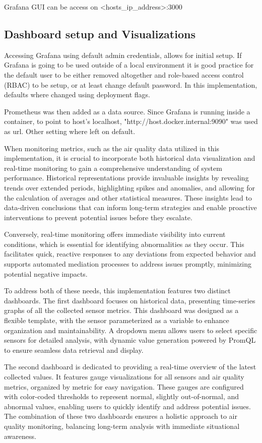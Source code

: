 Grafana GUI can be access on <hosts\_ip\_address>:3000

\subsection{Dashboard setup and Visualizations}
Accessing Grafana using default admin credentials, allows for initial setup. If Grafana is going to be used outside of a local environment it is good practice for the default user to be either removed altogether and role-based access control (RBAC) to be setup, or at least change default password. In this implementation, defaults where changed using deployment flags.

Prometheus was then added as a data source. Since Grafana is running inside a container, to point to host's localhost, "http://host.docker.internal:9090" was used as url. Other setting where left on default.

When monitoring metrics, such as the air quality data utilized in this implementation, it is crucial to incorporate both historical data visualization and real-time monitoring to gain a comprehensive understanding of system performance. Historical representations provide invaluable insights by revealing trends over extended periods, highlighting spikes and anomalies, and allowing for the calculation of averages and other statistical measures. These insights lead to data-driven conclusions that can inform long-term strategies and enable proactive interventions to prevent potential issues before they escalate.

Conversely, real-time monitoring offers immediate visibility into current conditions, which is essential for identifying abnormalities as they occur. This facilitates quick, reactive responses to any deviations from expected behavior and supports automated mediation processes to address issues promptly, minimizing potential negative impacts.

To address both of these needs, this implementation features two distinct dashboards. The first dashboard focuses on historical data, presenting time-series graphs of all the collected sensor metrics. This dashboard was designed as a flexible template, with the sensor parameterized as a variable to enhance organization and maintainability. A dropdown menu allows users to select specific sensors for detailed analysis, with dynamic value generation powered by PromQL to ensure seamless data retrieval and display.

The second dashboard is dedicated to providing a real-time overview of the latest collected values. It features gauge visualizations for all sensors and air quality metrics, organized by metric for easy navigation. These gauges are configured with color-coded thresholds to represent normal, slightly out-of-normal, and abnormal values, enabling users to quickly identify and address potential issues. The combination of these two dashboards ensures a holistic approach to air quality monitoring, balancing long-term analysis with immediate situational awareness. 

